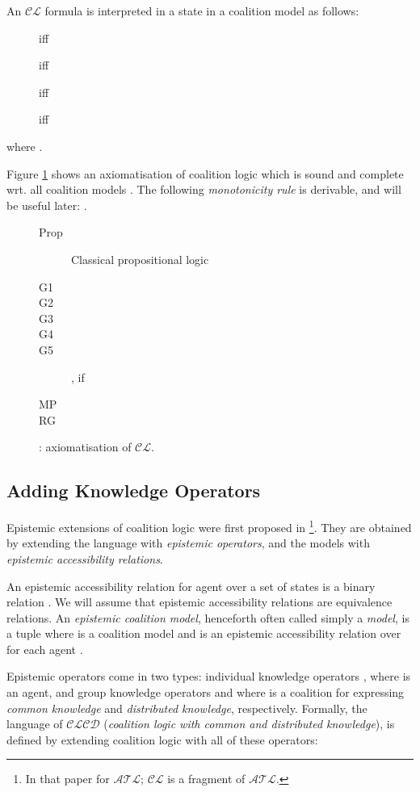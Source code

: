 \documentclass{article}
\newcommand{\acro}[1]{\ensuremath{\mathcal{#1}}}
\begin{document}
An \acro{CL} formula is interpreted in a state in a coalition model as follows:
\begin{description}
\item[]  iff 
\item[]  iff 
\item[]  iff 
\item[]  iff 
\end{description}
where .

Figure \ref{fig:cl-ax} shows an axiomatisation  of coalition logic
which is sound and complete wrt. all coalition models
\cite{pauly:2002a}. The following \emph{monotonicity rule} is
derivable, and will be useful later: .
\begin{figure}[h]
  \centering
\begin{description}
\item[Prop] Classical propositional logic
\item[G1] 
\item[G2] 
\item[G3] 
\item[G4] 
\item[G5] , if 
\item[MP] 
\item[RG] 
\end{description}
  \caption{: axiomatisation of \acro{CL}.}
  \label{fig:cl-ax}
\end{figure}


\subsection{Adding Knowledge Operators}

Epistemic extensions of coalition logic were first proposed in
\cite{Hoek2003a}\footnote{In that paper for \acro{ATL}; \acro{CL} is a
  fragment of \acro{ATL}.}. They are obtained by extending the
language with \emph{epistemic operators}, and the models with
\emph{epistemic accessibility relations}.

An epistemic accessibility relation for agent  over a set of states
 is a binary relation . We will assume
that epistemic accessibility relations are equivalence relations. An
\emph{epistemic coalition model}, henceforth often called simply a
\emph{model}, is a tuple
 where  is a
coalition model and  is an epistemic accessibility relation
over  for each agent .

Epistemic operators come in two types: individual knowledge operators
, where  is an agent, and group knowledge operators  and
 where  is a coalition for expressing \emph{common knowledge}
and \emph{distributed knowledge}, respectively. Formally, the language
of \acro{CLCD} (\emph{coalition logic with common and distributed
  knowledge}), is defined by extending coalition logic with all of
these operators:
\end{document}
